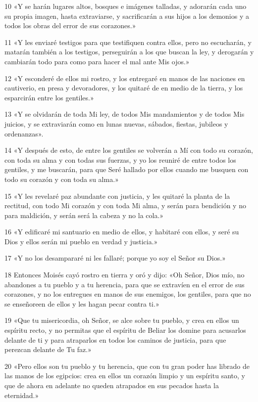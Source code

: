\par 10 «Y se harán lugares altos, bosques e imágenes talladas, y adorarán cada uno su propia imagen, hasta extraviarse, y sacrificarán a sus hijos a los demonios y a todos los obras del error de sus corazones.»
\par 11 «Y les enviaré testigos para que testifiquen contra ellos, pero no escucharán, y matarán también a los testigos, perseguirán a los que buscan la ley, y derogarán y cambiarán todo para como para hacer el mal ante Mis ojos.»
\par 12 «Y esconderé de ellos mi rostro, y los entregaré en manos de las naciones en cautiverio, en presa y devoradores, y los quitaré de en medio de la tierra, y los esparcirán entre los gentiles.»
\par 13 «Y se olvidarán de toda Mi ley, de todos Mis mandamientos y de todos Mis juicios, y se extraviarán como en lunas nuevas, sábados, fiestas, jubileos y ordenanzas».
\par 14 «Y después de esto, de entre los gentiles se volverán a Mí con todo su corazón, con toda su alma y con todas sus fuerzas, y yo los reuniré de entre todos los gentiles, y me buscarán, para que Seré hallado por ellos cuando me busquen con todo su corazón y con toda su alma.»
\par 15 «Y les revelaré paz abundante con justicia, y les quitaré la planta de la rectitud, con todo Mi corazón y con toda Mi alma, y ​​serán para bendición y no para maldición, y serán será la cabeza y no la cola.»
\par 16 «Y edificaré mi santuario en medio de ellos, y habitaré con ellos, y seré su Dios y ellos serán mi pueblo en verdad y justicia.»
\par 17 «Y no los desampararé ni les fallaré; porque yo soy el Señor su Dios.»
\par 18 Entonces Moisés cayó rostro en tierra y oró y dijo: «Oh Señor, Dios mío, no abandones a tu pueblo y a tu herencia, para que se extravíen en el error de sus corazones, y no los entregues en manos de sus enemigos, los gentiles, para que no se enseñoreen de ellos y les hagan pecar contra ti.»
\par 19 «Que tu misericordia, oh Señor, se alce sobre tu pueblo, y crea en ellos un espíritu recto, y no permitas que el espíritu de Beliar los domine para acusarlos delante de ti y para atraparlos en todos los caminos de justicia, para que perezcan delante de Tu faz.»
\par 20 «Pero ellos son tu pueblo y tu herencia, que con tu gran poder has librado de las manos de los egipcios: crea en ellos un corazón limpio y un espíritu santo, y que de ahora en adelante no queden atrapados en sus pecados hasta la eternidad.»

